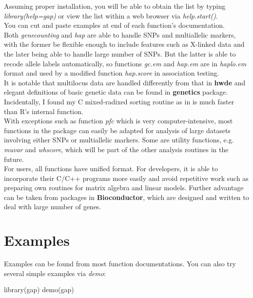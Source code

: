\documentclass[11pt,a4paper]{article}
\begin{document}
Assuming proper installation, you will be able to obtain the list by typing
\textit{library(help=gap)} or view the list within a web browser via 
\textit{help.start()}.\\

You can cut and paste examples at end of each function's documentation.\\

Both \textit{genecounting} and \textit{hap} are able to handle SNPs and multiallelic
markers, with the former be flexible enough to include features such as X-linked data
and the later being able to handle large number of SNPs. But the latter is able to
recode allele labels automatically, so functions \textit{gc.em} and \textit{hap.em}
are in \textit{haplo.em} format and used by a modified function \textit{hap.score} in
association testing.\\

It is notable that multilocus data are handled differently from that in {\bf hwde} and
elegant definitions of basic genetic data can be found in {\bf genetics} package.\\

Incidentally, I found my C mixed-radixed sorting routine as in \cite{zhao03} is much
faster than R's internal function.\\

With exceptions such as function \textit{pfc} which is very computer-intensive, most
functions in the package can easily be adapted for analysis of large datasets involving
either SNPs or multiallelic markers. Some are utility functions, e.g. \textit{muvar}
and \textit{whscore}, which will be part of the other analysis routines in the future.\\

For users, all functions have unified format. For developers, it is able to incorporate
their C/C++ programs more easily and avoid repetitive work such as preparing own routines
for matrix algebra and linear models. Further advantage can be taken from packages in
{\bf Bioconductor}, which are designed and written to deal with large number of genes.


\section{Examples}

Examples can be found from most function documentations. You can also try several simple
examples via \textit{demo}:

\begin{Schunk}
\begin{Scode}
library(gap)
demo(gap)
\end{Scode}
\end{Schunk}
\end{document}
